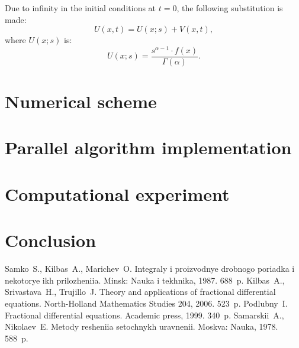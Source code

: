 \documentclass[11pt, oneside, a4paper]{article}
\begin{document}
Due to infinity in the initial conditions at $t=0$, the following substitution is made:
\begin{equation}
	U(x,t) = U(x;s) + V(x,t),
\end{equation}
where $U(x;s)$ is:
\begin{equation}
	U(x;s) = \frac{s^{\alpha-1} \cdot f(x)}{\Gamma(\alpha)}.
\end{equation}

\section{Numerical scheme}

\section{Parallel algorithm implementation}

\section{Computational experiment}

\section{Conclusion}

\begin{biblio}
Samko~S., Kilbas~A., Marichev~O. Integraly i proizvodnye drobnogo poriadka i nekotorye ikh prilozheniia. Minsk: Nauka i tekhnika, 1987. 688~p.
Kilbas~A., Srivastava~H., Trujillo~J. Theory and applications of fractional differential equations. North-Holland Mathematics Studies 204, 2006. 523~p.
Podlubny~I. Fractional differential equations. Academic press, 1999. 340~p.
Samarskii~A., Nikolaev~E. Metody resheniia setochnykh uravnenii. Moskva: Nauka, 1978. 588~p.
\end{biblio}
\end{document}
